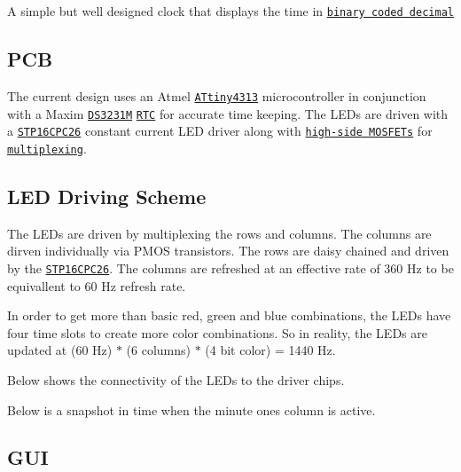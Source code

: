 A simple but well designed clock that displays the time in \href{https://en.wikipedia.org/wiki/Binary-coded_decimal}{\tt binary coded decimal}

\subsection*{P\+CB}



The current design uses an Atmel \href{http://www.atmel.com/devices/ATTINY4313.aspx}{\tt A\+Ttiny4313} microcontroller in conjunction with a Maxim \href{https://www.maximintegrated.com/en/products/digital/real-time-clocks/DS3231M.html}{\tt D\+S3231M} \href{https://en.wikipedia.org/wiki/Real-time_clock}{\tt R\+TC} for accurate time keeping. The L\+E\+Ds are driven with a \href{http://www.st.com/content/st_com/en/products/power-management/led-drivers/led-array-drivers/stp16cpc26.html}{\tt S\+T\+P16\+C\+P\+C26} constant current L\+ED driver along with \href{https://en.wikipedia.org/wiki/MOSFET#Single-type}{\tt high-\/side M\+O\+S\+F\+E\+Ts} for \href{https://en.wikipedia.org/wiki/Multiplexing}{\tt multiplexing}.

\subsection*{L\+ED Driving Scheme}

The L\+E\+Ds are driven by multiplexing the rows and columns. The columns are dirven individually via P\+M\+OS transistors. The rows are daisy chained and driven by the \href{http://www.st.com/content/st_com/en/products/power-management/led-drivers/led-array-drivers/stp16cpc26.html}{\tt S\+T\+P16\+C\+P\+C26}. The columns are refreshed at an effective rate of 360 Hz to be equivallent to 60 Hz refresh rate.

In order to get more than basic red, green and blue combinations, the L\+E\+Ds have four time slots to create more color combinations. So in reality, the L\+E\+Ds are updated at (60 Hz) $\ast$ (6 columns) $\ast$ (4 bit color) = 1440 Hz.

Below shows the connectivity of the L\+E\+Ds to the driver chips.



Below is a snapshot in time when the minute ones column is active.



\subsection*{G\+UI}

